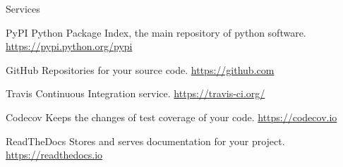 \begin{frame}{Services}
    \begin{block}{PyPI}
        Python Package Index, the main repository of python software.
        \href{https://pypi.python.org/pypi}{https://pypi.python.org/pypi}
    \end{block}
    \pause
    \begin{block}{GitHub}
        Repositories for your source code.
        \href{https://github.com}{https://github.com}
    \end{block}
    \pause
    \begin{block}{Travis}
        Continuous Integration service.
        \href{https://travis-ci.org/}{https://travis-ci.org/}
    \end{block}
    \pause
    \begin{block}{Codecov}
        Keeps the changes of test coverage of your code.
        \href{https://codecov.io}{https://codecov.io}
    \end{block}
    \pause
    \begin{block}{ReadTheDocs}
        Stores and serves documentation for your project.
        \href{https://readthedocs.io}{https://readthedocs.io}
    \end{block}
\end{frame}
